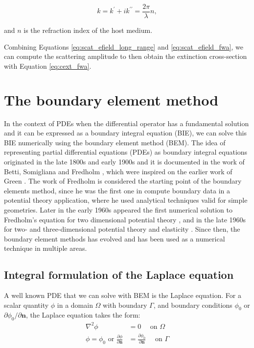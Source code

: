 \begin{equation}
    k = k^\prime + ik^{\prime\prime} = \frac{2\pi}{\lambda} n,
\end{equation}

and $n$ is the refraction index of the host medium.

Combining Equations \eqref{eq:scat_efield_long_range} and \eqref{eq:scat_efield_fwa},
we can compute the scattering amplitude to then obtain the extinction cross-section 
with Equation \eqref{eq:cext_fwa}.

\section{The boundary element method} \label{sec:lspr_bem}

In the context of PDEs when the differential operator has a fundamental solution and it can be expressed as a boundary integral equation (BIE), we can solve 
this BIE numerically using the boundary element method (BEM). The idea of representing partial differential equations (PDEs) as boundary integral 
equations originated in the late 1800s and early 1900s and it is documented in the work of Betti, Somigliana and Fredholm \cite{Betti1872,Somigliana1885,Fredholm1903},
which were inspired on the earlier work of Green \cite{Green1828}. The work of Fredholm is considered the starting point of the boundary elements method, 
since he was the first one in compute boundary data in a potential theory application, where he used analytical techniques valid for simple geometries. Later in 
the early 1960s appeared the first numerical solution to Fredholm's equation for two dimensional potential theory \cite{Jawson1963,Symm1963}, and in the late 1960s 
for two- and three-dimensional potential theory and elasticity \cite{Rizzo1967,Cruse1969}. Since then, the boundary element methods has evolved and has been used 
as a numerical technique in multiple areas\cite{Atkinson1997,McLean2000,Steinbach2008, BrebbiaDominguez1992, Katsikadelis2002}. 


\subsection{Integral formulation of the Laplace equation} \label{ssec:int_form}

A well known PDE that we can solve with BEM is the Laplace equation. For a scalar quantity $\phi$ in a domain $\Omega$ with boundary $\Gamma$, and 
boundary conditions $\phi_0$ or $\partial \phi_0/\partial \mathbf{n}$, the Laplace equation takes the form:
%
\begin{align} \label{eq:lap_pde}
\nabla^2\phi &= 0 \quad \text{ on $\Omega$} \nonumber \\
\phi = \phi_0 \text{ or } \frac{\partial \phi}{\partial \mathbf{n}} &= \frac{\partial \phi_0}{\partial \mathbf{n}} \quad \text{ on $\Gamma$} 
\end{align}

